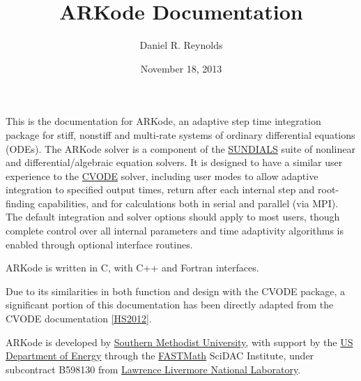 \documentclass[letterpaper,10pt,english]{sphinxmanual}
\title{ARKode Documentation}
\date{November 18, 2013}
\author{Daniel R. Reynolds}
\begin{document}
\maketitle
\tableofcontents
{}\label{index::doc}


This is the documentation for ARKode, an adaptive step time
integration package for stiff, nonstiff and multi-rate systems of
ordinary differential equations (ODEs).
The ARKode solver is a component of the \href{https://computation.llnl.gov/casc/sundials/main.html}{SUNDIALS} suite of
nonlinear and differential/algebraic equation solvers. It is designed
to have a similar user experience to the \href{https://computation.llnl.gov/casc/sundials/description/description.html\#descr\_cvode}{CVODE}
solver, including user modes to allow adaptive integration to specified
output times, return after each internal step and root-finding
capabilities, and for calculations both in serial and parallel (via
MPI). The default integration and solver options should apply to most
users, though complete control over all internal parameters and time
adaptivity algorithms is enabled through optional interface routines.

ARKode is written in C, with C++ and Fortran interfaces.

Due to its similarities in both function and design with the CVODE
package, a significant portion of this documentation has been directly
adapted from the CVODE documentation {\hyperref[References:hs2012]{{[}HS2012{]}}}.

ARKode is developed by \href{http://www.smu.edu}{Southern Methodist University}, with support by the \href{http://www.doe.gov}{US Department of Energy} through the \href{http://www.fastmath-scidac.org/}{FASTMath} SciDAC Institute, under subcontract
B598130 from \href{http://www.llnl.gov}{Lawrence Livermore National Laboratory}.
\end{document}
